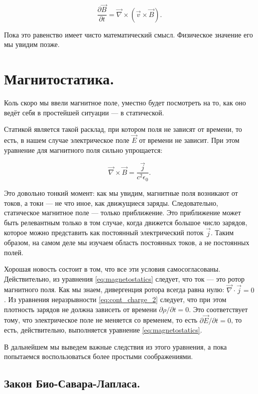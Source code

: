 \documentclass[a4paper,12pt]{article}
\numberwithin{equation}{section}
\newcommand{\pt}{\partial}
\newcommand{\eps}{\epsilon}
\newcommand{\vn}{\vec{\nabla}}
\begin{document}
\begin{equation}
  \label{eq:db/dt_2}
  \frac{\pt \vec{B}}{\pt t} = \vn \times \left( \vec{v} \times \vec{B}  \right).
\end{equation}

Пока это равенство имеет чисто математический смысл. Физическое
значение его мы увидим позже. 


\section{Магнитостатика.}
\label{sec:magnetostatics}

Коль скоро мы ввели магнитное поле, уместно будет посмотреть на то,
как оно ведёт себя в простейшей ситуации — в статической. 

Статикой является такой расклад, при котором поля не зависят от
времени, то есть, в нашем случае электрическое поле $\vec{E}$ от
времени не зависит. При этом уравнение для магнитного поля сильно
упрощается: 

\begin{equation}
  \label{eq:magnetostatics}
  \vn \times \vec{B} = \frac{\vec{j}}{c^2\eps_0}.
\end{equation}

Это довольно тонкий момент: как мы увидим, магнитные поля возникают от
токов, а токи --- не что иное, как движущиеся заряды. Следовательно,
статическое магнитное поле --- только приближение. Это приближение
может быть релевантным только в том случае, когда движется большое
число зарядов, которое можно представить как постоянный электрический
поток $\vec{j}$. Таким образом, на самом деле мы изучаем область
постоянных токов, а не постоянных полей. 

Хорошая новость состоит в том, что все эти условия
самосогласованы. Действительно, из уравнения \eqref{eq:magnetostatics}
следует, что ток --- это ротор магнитного поля. Как мы знаем,
дивергенция ротора всегда равна нулю: $\vn \cdot \vec{j} =0$. Из
уравнения неразрывности \eqref{eq:cont_charge_2} следует, что при этом
плотность зарядов не должна зависеть от времени $\pt \rho / \pt t
=0$. Это соответствует тому, что электрическое поле не меняется со
временем, то есть $\pt \vec{E}/ \pt t =0$, то есть, действительно,
выполняется уравнение \eqref{eq:magnetostatics}.

В дальнейшем мы выведем важные следствия из этого уравнения, а пока
попытаемся воспользоваться более простыми соображениями. 

\subsection{Закон Био-Савара-Лапласа.}
\label{sec:biot_savart_law}
\end{document}
